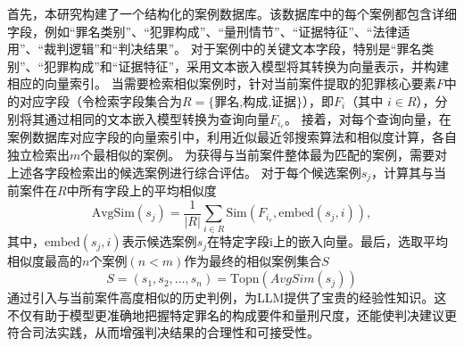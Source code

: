 首先，本研究构建了一个结构化的案例数据库。该数据库中的每个案例都包含详细字段，例如“罪名类别”、“犯罪构成”、“量刑情节”、“证据特征”、“法律适用”、“裁判逻辑”和“判决结果”。
对于案例中的关键文本字段，特别是“罪名类别”、“犯罪构成”和“证据特征”，采用文本嵌入模型将其转换为向量表示，并构建相应的向量索引。
当需要检索相似案例时，针对当前案件提取的犯罪核心要素$F$中的对应字段（令检索字段集合为$R=\{\text{罪名,构成,证据}\}$），即$F_i$​（其中 $i\in R$），分别将其通过相同的文本嵌入模型转换为查询向量$F_{i_e}$​​。
接着，对每个查询向量，在案例数据库对应字段的向量索引中，利用近似最近邻搜索算法和相似度计算，各自独立检索出$m$个最相似的案例。
为获得与当前案件整体最为匹配的案例，需要对上述各字段检索出的候选案例进行综合评估。
对于每个候选案例$s_j$​，计算其与当前案件在$R$中所有字段上的平均相似度
{
\small
\begin{equation}
    \text{AvgSim}(s_j) = \frac{1}{|R|} \sum_{i \in R} \text{Sim}\left( F_{i_e}, \text{embed}(s_j, i) \right),
\end{equation}
}
其中，$\text{embed}(s_j,i)$表示候选案例$s_j$​在特定字段$\text{i}$上的嵌入向量。最后，选取平均相似度最高的$n$个案例$(n<m)$作为最终的相似案例集合$S$
\begin{equation}
	S=(s_1​,s_2​,\dots,s_n​)=\text{Topn​}(AvgSim(s_j​))
\end{equation}
通过引入与当前案件高度相似的历史判例，为LLM提供了宝贵的经验性知识。这不仅有助于模型更准确地把握特定罪名的构成要件和量刑尺度，还能使判决建议更符合司法实践，从而增强判决结果的合理性和可接受性。


